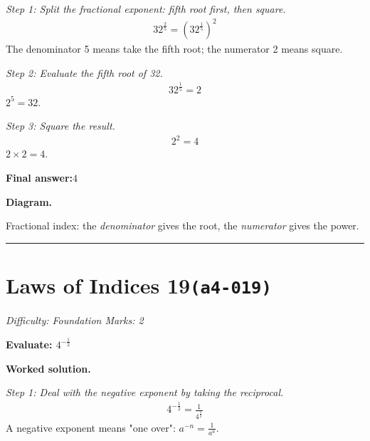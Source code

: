 \documentclass[11pt]{article}
\newcommand{\question}[1]{\par\medskip\noindent\textbf{#1}\par}
\begin{document}
\textit{Step 1: Split the fractional exponent: fifth root first, then square.}
\[\begin{gathered}
32^{\frac{2}{5}} = \left(32^{\frac{1}{5}}\right)^2
\end{gathered}\]
The denominator 5 means take the fifth root; the numerator 2 means square.

\textit{Step 2: Evaluate the fifth root of 32.}
\[\begin{gathered}
32^{\frac{1}{5}} = 2
\end{gathered}\]
\( 2^5 = 32 \).

\textit{Step 3: Square the result.}
\[\begin{gathered}
2^2 = 4
\end{gathered}\]
\( 2 \times 2 = 4 \).

\begin{answerbox}
\textbf{Final answer:}\quad \(\displaystyle 4\)
\end{answerbox}
\textbf{Diagram.}

\begin{center}
\end{center}
\small Fractional index: the \emph{denominator} gives the root, the \emph{numerator} gives the power.\normalsize

\medskip\hrule

\section*{Laws of Indices 19\quad\small\texttt{(a4-019)}}
\textit{Difficulty: Foundation \quad\textbar\quad Marks: 2}

\question{Evaluate: \( 4^{-\frac{1}{2}} \)}

\textbf{Worked solution.}

\textit{Step 1: Deal with the negative exponent by taking the reciprocal.}
\[\begin{gathered}
4^{-\frac{1}{2}} = \frac{1}{4^{\frac{1}{2}}}
\end{gathered}\]
A negative exponent means "one over": \( a^{-n} = \frac{1}{a^n} \).
\end{document}
